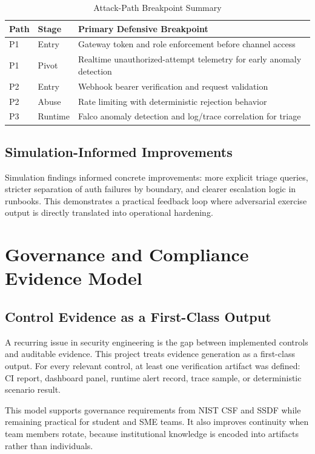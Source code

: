 \documentclass[conference]{IEEEtran}
\begin{document}
\begin{table}[!t]
\caption{Attack-Path Breakpoint Summary}
\centering
\footnotesize
\begin{tabularx}{\linewidth}{>{\raggedright\arraybackslash}p{0.9cm} >{\raggedright\arraybackslash}p{0.9cm} Y}
\toprule
Path & Stage & Primary Defensive Breakpoint \\
\midrule
P1 & Entry & Gateway token and role enforcement before channel access \\
P1 & Pivot & Realtime unauthorized-attempt telemetry for early anomaly detection \\
P2 & Entry & Webhook bearer verification and request validation \\
P2 & Abuse & Rate limiting with deterministic rejection behavior \\
P3 & Runtime & Falco anomaly detection and log/trace correlation for triage \\
\bottomrule
\end{tabularx}
\label{tab:attackpaths}
\end{table}

\subsection{Simulation-Informed Improvements}
Simulation findings informed concrete improvements: more explicit triage queries, stricter separation of auth failures by boundary, and clearer escalation logic in runbooks. This demonstrates a practical feedback loop where adversarial exercise output is directly translated into operational hardening.

\section{Governance and Compliance Evidence Model}
\subsection{Control Evidence as a First-Class Output}
A recurring issue in security engineering is the gap between implemented controls and auditable evidence. This project treats evidence generation as a first-class output. For every relevant control, at least one verification artifact was defined: CI report, dashboard panel, runtime alert record, trace sample, or deterministic scenario result.

This model supports governance requirements from NIST CSF and SSDF \cite{nistcsf,devsecopsnist} while remaining practical for student and SME teams. It also improves continuity when team members rotate, because institutional knowledge is encoded into artifacts rather than individuals.
\end{document}
